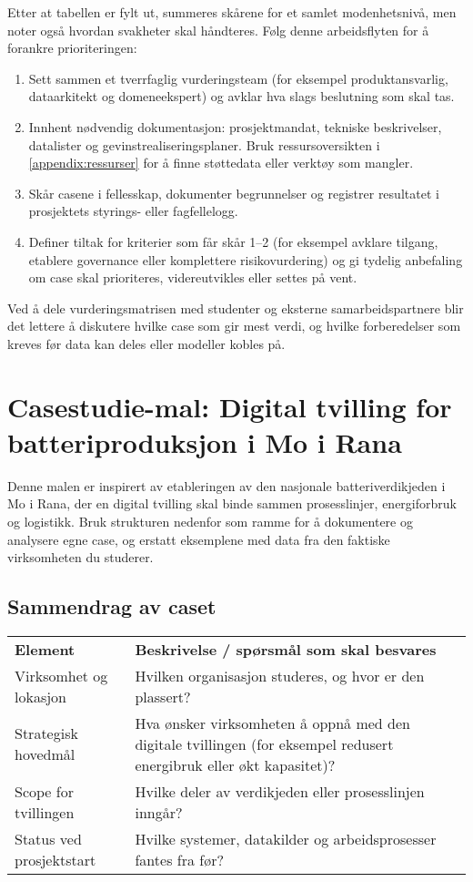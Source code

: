 Etter at tabellen er fylt ut, summeres skårene for et samlet modenhetsnivå, men noter også hvordan svakheter skal håndteres.
Følg denne arbeidsflyten for å forankre prioriteringen:

\begin{enumerate}
    \item Sett sammen et tverrfaglig vurderingsteam (for eksempel produktansvarlig, dataarkitekt og domeneekspert) og avklar
    hva slags beslutning som skal tas.
    \item Innhent nødvendig dokumentasjon: prosjektmandat, tekniske beskrivelser, datalister og gevinstrealiseringsplaner. Bruk
    ressursoversikten i \autoref{appendix:ressurser} for å finne støttedata eller verktøy som mangler.
    \item Skår casene i fellesskap, dokumenter begrunnelser og registrer resultatet i prosjektets styrings- eller fagfellelogg.
    \item Definer tiltak for kriterier som får skår 1--2 (for eksempel avklare tilgang, etablere governance eller komplettere
    risikovurdering) og gi tydelig anbefaling om case skal prioriteres, videreutvikles eller settes på vent.
\end{enumerate}

Ved å dele vurderingsmatrisen med studenter og eksterne samarbeidspartnere blir det lettere å diskutere hvilke case som gir mest
verdi, og hvilke forberedelser som kreves før data kan deles eller modeller kobles på.

\section{Casestudie-mal: Digital tvilling for batteriproduksjon i Mo i Rana}
Denne malen er inspirert av etableringen av den nasjonale batteriverdikjeden i Mo i Rana, der en digital tvilling skal binde sammen prosesslinjer, energiforbruk og logistikk. Bruk strukturen nedenfor som ramme for å dokumentere og analysere egne case, og erstatt eksemplene med data fra den faktiske virksomheten du studerer.

\subsection{Sammendrag av caset}
\begin{tabular}{p{}p{}}
\textbf{Element} & \textbf{Beskrivelse / spørsmål som skal besvares} \\
Virksomhet og lokasjon & Hvilken organisasjon studeres, og hvor er den plassert? \\
Strategisk hovedmål & Hva ønsker virksomheten å oppnå med den digitale tvillingen (for eksempel redusert energibruk eller økt kapasitet)? \\
Scope for tvillingen & Hvilke deler av verdikjeden eller prosesslinjen inngår? \\
Status ved prosjektstart & Hvilke systemer, datakilder og arbeidsprosesser fantes fra før? \\
\end{tabular}

